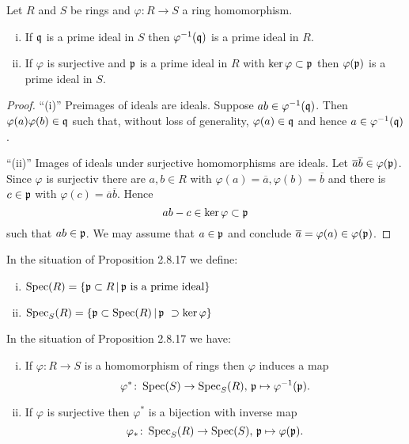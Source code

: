 

\begin{Prop}
Let $R$ and $S$ be rings and $\varphi\colon R \to S$ a ring homomorphism.
\begin{enumerate}[(i)]
\item If $\mathfrak{q}$ is a prime ideal in $S$ then $\varphi^{-1}(\mathfrak{q})$ is a prime ideal in $R$.
\item If $\varphi$ is surjective and $\mathfrak{p}$ is a prime ideal in $R$ with $\ker \varphi \subset \mathfrak{p}$ then $\varphi(\mathfrak{p})$ is a prime ideal in $S$.
\end{enumerate}
\end{Prop}


\begin{proof}
\enquote{(i)} Preimages of ideals are ideals. Suppose $ab \in \varphi^{-1}(\mathfrak{q})$. Then $\varphi(a)\varphi(b)  \in\mathfrak{q}$ such that, without loss of generality, $\varphi(a) \in \mathfrak{q}$
and hence $a \in \varphi^{-1}(\mathfrak{q})$.

\bigskip
\enquote{(ii)} Images of ideals under surjective homomorphisms are ideals. Let $\overline{a} \overline{b} \in \varphi(\mathfrak{p})$. Since $\varphi$ is surjectiv there are $a,b \in R$ with $\varphi(a) = \overline{a}, \varphi(b)= \overline{b}$ and there is $c \in \mathfrak{p}$ with $\varphi(c) = \overline{a}\overline{b}$. Hence
\[ ab - c \in \ker \varphi \subset \mathfrak{p}
\]
such that $ab \in \mathfrak{p}$. We may assume that $a \in \mathfrak{p}$ and conclude $\overline{a} = \varphi(a) \in \varphi(\mathfrak{p})$.
\end{proof}


\begin{defi}
In the situation of Proposition 2.8.17 we define:
\begin{enumerate}[(i)]
\item $\operatorname{Spec}(R) = \left\{\mathfrak{p} \subset R \, | \, \mathfrak{p} \text{ is a prime ideal}\right\}$
\item $\operatorname{Spec}_S(R) = \left\{\mathfrak{p} \subset \operatorname{Spec}(R) \, | \, \mathfrak{p} \ \supset \ker \varphi\right\}$
\end{enumerate}
\end{defi}


\begin{Kor}
In the situation of Proposition 2.8.17 we have:
\begin{enumerate}[(i)]
\item If $\varphi \colon R \to S$ is a homomorphism of rings then $\varphi$ induces a map
\[ \varphi^* \colon \operatorname{Spec}(S) \to \operatorname{Spec}_S(R), \, \mathfrak{p} \mapsto \varphi^{-1}(\mathfrak{p}).
\]
\item If $\varphi$ is surjective then $\varphi^*$ is a bijection with inverse map
\[ \varphi_* \colon \operatorname{Spec}_S(R) \to \operatorname{Spec}(S), \, \mathfrak{p} \mapsto \varphi(\mathfrak{p}).
\]
\end{enumerate}
\end{Kor}

